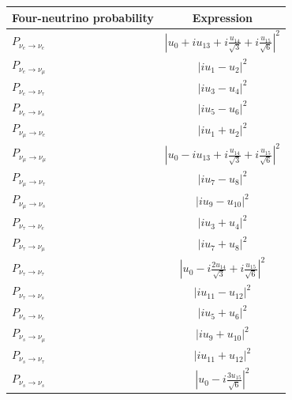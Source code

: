 \documentclass[final,5p,times,twocolumn]{elsarticle}
\providecommand{\DIFaddtex}[1]{{\protect\color{blue} \sf #1}} %
\providecommand{\DIFaddFL}[1]{\DIFadd{#1}} %
\providecommand{\DIFadd}[1]{\DIFaddtex{#1}} %
\begin{document}
{\def\arraystretch{1.3}
\begin{table}[t!]
  \begin{tabular}{lc}
   \DIFaddFL{Four-neutrino probability }& \DIFaddFL{Expression }\\
   \hline
   \DIFaddFL{$P_{\nu_e \to \nu_e}$        }& \DIFaddFL{$\left\vert u_0 + i u_{13} + i \frac{u_{14}}{\sqrt{3}} + i \frac{u_{15}}{\sqrt{6}} \right\vert^2$ }\\
   \DIFaddFL{$P_{\nu_e \to \nu_\mu}$      }& \DIFaddFL{$\left\vert i u_1 - u_2 \right\vert^2$ }\\
   \DIFaddFL{$P_{\nu_e \to \nu_\tau}$     }& \DIFaddFL{$\left\vert i u_3 - u_4 \right\vert^2$ }\\
   \DIFaddFL{$P_{\nu_e \to \nu_s}$        }& \DIFaddFL{$\left\vert i u_5 - u_6 \right\vert^2$ }\\
   \DIFaddFL{$P_{\nu_\mu \to \nu_e}$      }& \DIFaddFL{$\left\vert i u_1 + u_2 \right\vert^2$ }\\
   \DIFaddFL{$P_{\nu_\mu \to \nu_\mu}$    }& \DIFaddFL{$\left\vert u_0 - i u_{13} + i \frac{u_{14}}{\sqrt{3}} + i \frac{u_{15}}{\sqrt{6}} \right\vert^2$ }\\
   \DIFaddFL{$P_{\nu_\mu \to \nu_\tau}$   }& \DIFaddFL{$\left\vert i u_7 - u_8 \right\vert^2$ }\\
   \DIFaddFL{$P_{\nu_\mu \to \nu_s}$      }& \DIFaddFL{$\left\vert i u_9 - u_{10} \right\vert^2$ }\\
   \DIFaddFL{$P_{\nu_\tau \to \nu_e}$     }& \DIFaddFL{$\left\vert i u_3 + u_4 \right\vert^2$ }\\
   \DIFaddFL{$P_{\nu_\tau \to \nu_\mu}$   }& \DIFaddFL{$\left\vert i u_7 + u_8 \right\vert^2$ }\\
   \DIFaddFL{$P_{\nu_\tau \to \nu_\tau}$  }& \DIFaddFL{$\left\vert u_0 - i \frac{2 u_{14}}{\sqrt{3}} + i \frac{u_{15}}{\sqrt{6}} \right\vert^2$ }\\
   \DIFaddFL{$P_{\nu_\tau \to \nu_s}$     }& \DIFaddFL{$\left\vert i u_{11} - u_{12} \right\vert^2$ }\\
   \DIFaddFL{$P_{\nu_s \to \nu_e}$        }& \DIFaddFL{$\left\vert i u_5 + u_6 \right\vert^2$ }\\
   \DIFaddFL{$P_{\nu_s \to \nu_\mu}$      }& \DIFaddFL{$\left\vert i u_9 + u_{10} \right\vert^2$ }\\
   \DIFaddFL{$P_{\nu_s \to \nu_\tau}$     }& \DIFaddFL{$\left\vert i u_{11} + u_{12} \right\vert^2$ }\\
   \DIFaddFL{$P_{\nu_s \to \nu_s}$        }& \DIFaddFL{$\left\vert u_0 - i \frac{3 u_{15}}{\sqrt{6}} \right\vert^2$ }\\

\end{tabular}
\end{table}}
\end{document}
